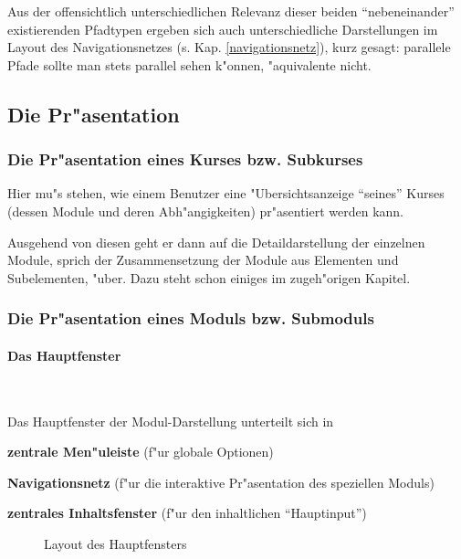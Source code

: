 Aus der offensichtlich unterschiedlichen Relevanz dieser beiden
``nebeneinander'' existierenden Pfadtypen ergeben sich auch
unterschiedliche Darstellungen im Layout des Navigationsnetzes
(s. Kap. \ref{navigationsnetz}), 
kurz gesagt: parallele Pfade sollte man stets parallel sehen k"onnen,
"aquivalente nicht.


\subsection{Die Pr"asentation}

\subsubsection{Die Pr"asentation eines Kurses bzw. Subkurses}

Hier mu"s stehen, wie einem Benutzer eine "Ubersichtsanzeige ``seines''
Kurses (dessen Module und deren Abh"angigkeiten) pr"asentiert werden
kann.

Ausgehend von diesen geht er dann auf die Detaildarstellung der
einzelnen Module, sprich der Zusammensetzung der Module aus Elementen
und Subelementen, "uber. Dazu steht schon einiges im zugeh"origen
Kapitel.


\subsubsection{Die Pr"asentation eines Moduls bzw. Submoduls}

\paragraph{Das Hauptfenster}

\mbox{ }
\vspace{0mm}

Das Hauptfenster der Modul-Darstellung unterteilt sich in

\begin{list_sabina}
        \item \textbf{zentrale Men"uleiste} (f"ur globale Optionen)
        \item \textbf{Navigationsnetz} (f"ur die interaktive Pr"asentation des speziellen Moduls)
        \item \textbf{zentrales Inhaltsfenster} (f"ur den inhaltlichen ``Hauptinput'')
\end{list_sabina}

\begin{figure}[h]
\begin{center}

\caption{Layout des Hauptfensters}
\end{center}
\end{figure}

